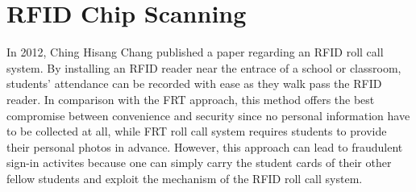 \section{RFID Chip Scanning}
In 2012, Ching Hisang Chang published a paper regarding an RFID roll call system.
By installing an RFID reader near the entrace of a school or classroom, students' attendance
can be recorded with ease as they walk pass the RFID reader. In comparison with the FRT approach,
this method offers the best compromise between convenience and security since no personal information
have to be collected at all, while FRT roll call system requires students to provide their personal
photos in advance. However, this approach can lead to fraudulent sign-in activites because
one can simply carry the student cards of their other fellow students and exploit the mechanism
of the RFID roll call system.

